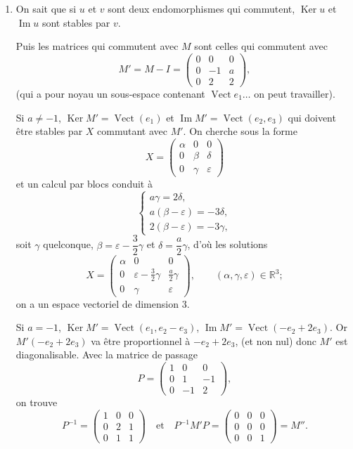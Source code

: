 \begin{enumerate}[label=\arabic*.,leftmargin=2.2em,itemsep=1.2em]
Il existe donc des réels $\lambda$ tels que $Q=U+\lambda V\in GL_n(\mathbb R)$ avec $QB=AQ$ soit encore $B=Q^{-1}AQ$ : $A$ et $B$ sont semblables dans $M_n(\mathbb R)$.

\item On sait que si $u$ et $v$ sont deux endomorphismes qui commutent, $\operatorname{Ker}u$ et $\operatorname{Im}u$ sont stables par $v$.

Puis les matrices qui commutent avec $M$ sont celles qui commutent avec
\[
M'=M-I=\begin{pmatrix}0&0&0\\0&-1&a\\0&2&2\end{pmatrix},
\]
(qui a pour noyau un sous-espace contenant $\operatorname{Vect}e_1\ldots$ on peut travailler).

Si $a\ne-1$, $\operatorname{Ker}M'=\operatorname{Vect}(e_1)$ et $\operatorname{Im}M'=\operatorname{Vect}(e_2,e_3)$ qui doivent être stables par $X$ commutant avec $M'$. On cherche sous la forme
\[
X=\begin{pmatrix}\alpha&0&0\\0&\beta&\delta\\0&\gamma&\varepsilon\end{pmatrix}
\]
et un calcul par blocs conduit à
\[
\begin{cases}
a\gamma=2\delta,\\
a(\beta-\varepsilon)=-3\delta,\\
2(\beta-\varepsilon)=-3\gamma,
\end{cases}
\]
soit $\gamma$ quelconque, $\beta=\varepsilon-\dfrac32\gamma$ et $\delta=\dfrac a2\gamma$, d'où les solutions
\[
X=\begin{pmatrix}
\alpha&0&0\\
0&\varepsilon-\frac32\gamma&\frac a2\gamma\\
0&\gamma&\varepsilon
\end{pmatrix},\qquad(\alpha,\gamma,\varepsilon)\in\mathbb R^3;
\]
on a un espace vectoriel de dimension 3.

Si $a=-1$, $\operatorname{Ker}M'=\operatorname{Vect}(e_1,e_2-e_3)$, $\operatorname{Im}M'=\operatorname{Vect}(-e_2+2e_3)$. Or $M'(-e_2+2e_3)$ va être proportionnel à $-e_2+2e_3$, (et non nul) donc $M'$ est diagonalisable. Avec la matrice de passage
\[
P=\begin{pmatrix}1&0&0\\0&1&-1\\0&-1&2\end{pmatrix},
\]
on trouve
\[
P^{-1}=\begin{pmatrix}1&0&0\\0&2&1\\0&1&1\end{pmatrix}
\quad\text{et}\quad
P^{-1}M'P=\begin{pmatrix}0&0&0\\0&0&0\\0&0&1\end{pmatrix}=M''.
\]


\end{enumerate}
